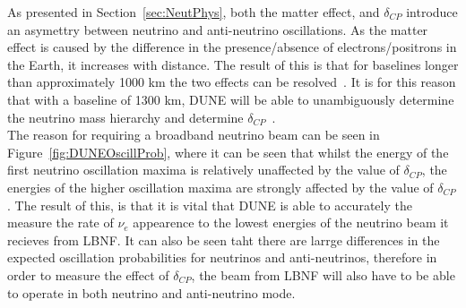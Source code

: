 As presented in Section~\ref{sec:NeutPhys}, both the matter effect, and $\delta_{CP}$ introduce an asymettry between neutrino and anti-neutrino oscillations. As the matter effect is caused by the difference in the presence/absence of electrons/positrons in the Earth, it increases with distance. The result of this is that for baselines longer than approximately 1000 km the two effects can be resolved~\citep{Bass:2013vcg}. It is for this reason that with a baseline of 1300 km, DUNE will be able to unambiguously determine the neutrino mass hierarchy and determine $\delta_{CP}$~\citep{Diwan:2004bt}. \\

The reason for requiring a broadband neutrino beam can be seen in Figure~\ref{fig:DUNEOscillProb}, where it can be seen that whilst the energy of the first neutrino oscillation maxima is relatively unaffected by the value of $\delta_{CP}$, the energies of the higher oscillation maxima are strongly affected by the value of $\delta_{CP}$. The result of this, is that it is vital that DUNE is able to accurately the measure the rate of $\nu_e$ appearence to the lowest energies of the neutrino beam it recieves from LBNF. It can also be seen taht there are larrge differences in the expected oscillation probabilities for neutrinos and anti-neutrinos, therefore in order to measure the effect of $\delta_{CP}$, the beam from LBNF will also have to be able to operate in both neutrino and anti-neutrino mode. \\

